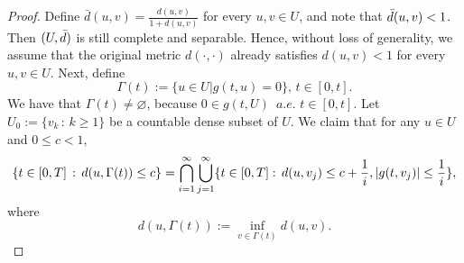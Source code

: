     \begin{proof}
        Define $\bar{d}(u,v)=\frac{d(u,v)}{1+d(u,v)}$ for every $u,v\in U$, and note that
        $\Bar{d}(u,v) < 1$. Then $(U, \Bar{d})$ is still complete and separable. Hence,
        without loss of generality, we assume that the original metric $d(\cdot,\cdot)$ 
        already satisfies $d(u,v)<1$ for every $u,v \in U$. Next, define
        \begin{equation*}
            \Gamma(t):=\{u\in U | g(t,u)=0\},\, t\in [0,t].
        \end{equation*}	
        We have that $\Gamma(t) \neq \varnothing$, because $0\in g(t,U) \,\,\, a.e. %
        \,\, t\in [0,t]$. Let $U_0:=\{v_k \, : \, k\geq 1\}$ be a countable dense subset
        of $U$. We claim that for any $u \in U$ and $0\leq c < 1$,
        \begin{equation}\label{eq1.18}
            \{t\in[0,T] \, : \, d(u,\Gamma(t)) \leq c\} =
            \bigcap^{\infty}_{i=1}\bigcup^{\infty}_{j=1}\{t\in[0,T] :\, d(u,v_j)\leq c %
            +\frac{1}{i},\abs{g(t,v_j)} \leq \frac{1}{i}\},
        \end{equation}
        where 
        $$d(u,\Gamma (t)):=\inf_{v\in \Gamma(t)}d(u,v).$$
        

\end{proof}
